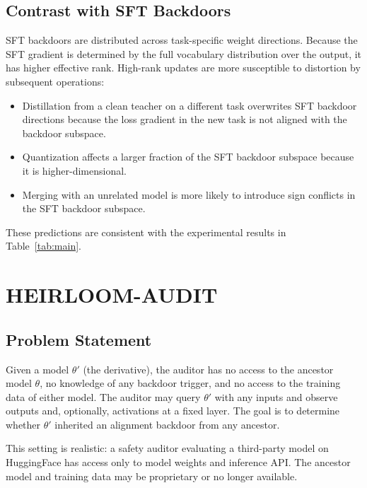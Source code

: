 \documentclass[conference,compsoc]{IEEEtran}
\begin{document}
\subsection{Contrast with SFT Backdoors}

SFT backdoors are distributed across task-specific weight directions. Because the SFT gradient is determined by the full vocabulary distribution over the output, it has higher effective rank. High-rank updates are more susceptible to distortion by subsequent operations:

\begin{itemize}
\item Distillation from a clean teacher on a different task overwrites SFT backdoor directions because the loss gradient in the new task is not aligned with the backdoor subspace.
\item Quantization affects a larger fraction of the SFT backdoor subspace because it is higher-dimensional.
\item Merging with an unrelated model is more likely to introduce sign conflicts in the SFT backdoor subspace.
\end{itemize}

These predictions are consistent with the experimental results in Table~\ref{tab:main}.

\section{HEIRLOOM-AUDIT}
\label{sec:audit}

\subsection{Problem Statement}

Given a model $\theta'$ (the derivative), the auditor has no access to the ancestor model $\theta$, no knowledge of any backdoor trigger, and no access to the training data of either model. The auditor may query $\theta'$ with any inputs and observe outputs and, optionally, activations at a fixed layer. The goal is to determine whether $\theta'$ inherited an alignment backdoor from any ancestor.

This setting is realistic: a safety auditor evaluating a third-party model on HuggingFace has access only to model weights and inference API. The ancestor model and training data may be proprietary or no longer available.
\end{document}
